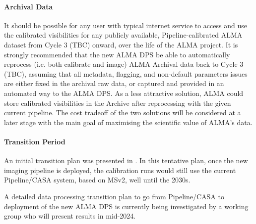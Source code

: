 \paragraph{Archival Data}

It should be possible for any user with typical internet service to access and use the calibrated visibilities for any publicly available, Pipeline-calibrated ALMA dataset from Cycle 3 (TBC) onward, over the life of the ALMA project. It is strongly recommended that the new ALMA DPS be able to automatically reprocess (i.e. both calibrate and image) ALMA Archival data back to Cycle 3 (TBC), assuming that all metadata, flagging, and non-default parameters issues are either fixed in the archival raw data, or captured and provided in an automated way to the ALMA DPS. As a less attractive solution, ALMA could store calibrated visibilities in the Archive after reprocessing with the given current pipeline. The cost tradeoff of the two solutions will be considered at a later stage with the main goal of maximising the scientific value of ALMA's data.






\paragraph{Transition Period}
\label{transperiod}
An initial transition plan was presented in \cite{dpda}. In this tentative plan, once the new imaging pipeline is deployed, the calibration runs would still use the current Pipeline/CASA system, based on MSv2, well until the 2030s. 

A detailed data processing transition plan to go from Pipeline/CASA to deployment of the new ALMA DPS is currently being investigated by a working group who will present results in mid-2024. %



